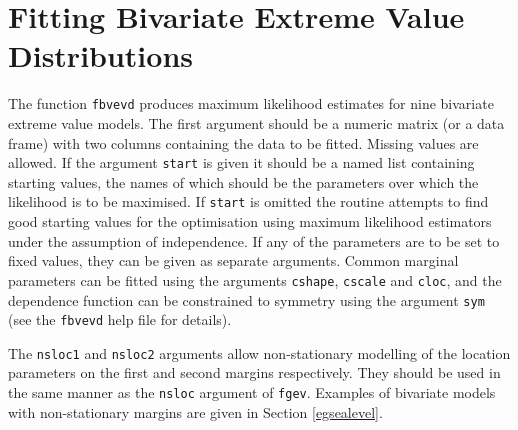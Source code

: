 \documentclass[11pt,a4paper]{article}
\begin{document}
\section{Fitting Bivariate Extreme Value Distributions}
\setcounter{footnote}{0}
\label{bivfit}

The function \verb+fbvevd+ produces maximum likelihood estimates for nine bivariate extreme value models.
The first argument should be a numeric matrix (or a data frame) with two columns containing the data to be fitted.
Missing values are allowed.
If the argument \verb+start+ is given it should be a named list containing starting values, the names of which should be the parameters over which the likelihood is to be maximised.
If \verb+start+ is omitted the routine attempts to find good starting values for the optimisation using maximum likelihood estimators under the assumption of independence.
If any of the parameters are to be set to fixed values, they can be given as separate arguments.
Common marginal parameters can be fitted using the arguments \verb+cshape+, \verb+cscale+ and \verb+cloc+, and the dependence function can be constrained to symmetry using the argument \verb+sym+ (see the \verb+fbvevd+ help file for details).

The \verb+nsloc1+ and \verb+nsloc2+ arguments allow non-stationary modelling of the location parameters on the first and second margins respectively.
They should be used in the same manner as the \verb+nsloc+ argument of \verb+fgev+.
Examples of bivariate models with non-stationary margins are given in Section \ref{egsealevel}.

\end{document}
